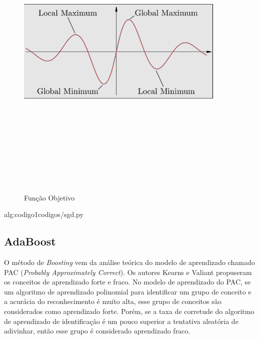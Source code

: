 \begin{figure}[ht]
    \centering
    \caption{Função Objetivo}
    \includegraphics[width=10cm,height=14cm,keepaspectratio]{figuras/funcao_objetivo.png} 
    \label{fig:internet} 
\end{figure}

 {alg:codigo1}{codigos/sgd.py}

\bigskip

\subsection{AdaBoost}

O método de \textit{Boosting} vem da análise teórica do modelo de aprendizado chamado PAC (\textit{Probably Approximately Correct}). Os autores Kearns e Valiant propuseram os conceitos de aprendizado forte e fraco. No modelo de aprendizado do PAC, se um algoritmo de aprendizado polinomial para identificar um grupo de conceito e a acurácia do reconhecimento é muito alta, esse grupo de conceitos são considerados como aprendizado forte. Porém, se a taxa de corretude do algoritmo de aprendizado de identificação é um pouco superior a tentativa aleatória de adivinhar, então esse grupo é considerado aprendizado fraco. 

